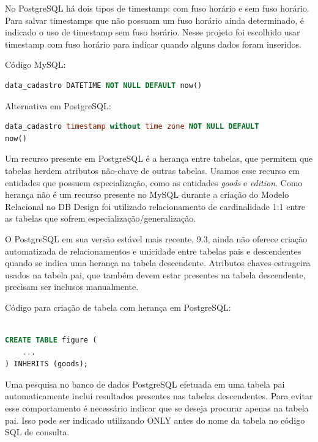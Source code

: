 \documentclass[12pt]{article}
\begin{document}
No PostgreSQL há dois tipos de timestamp: com fuso horário e sem fuso horário. Para salvar timestamps que não possuam um fuso horário ainda determinado, é indicado o uso de timestamp sem fuso horário. Nesse projeto foi escolhido usar timestamp com fuso horário para indicar quando alguns dados foram inseridos.

Código MySQL:

\begin{lstlisting}[language=SQL,morekeywords={now(),DATETIME}]
data_cadastro DATETIME NOT NULL DEFAULT now()
\end{lstlisting}

Alternativa em PostgreSQL:

\begin{lstlisting}[language=SQL,morekeywords={now(),without}]
data_cadastro timestamp without time zone NOT NULL DEFAULT
now()
\end{lstlisting}

Um recurso presente em PostgreSQL é a herança entre tabelas, que permitem que tabelas herdem atributos não-chave de outras tabelas. Usamos esse recurso em entidades que possuem especialização, como as entidades \textit{goods} e \textit{edition}. Como herança não é um recurso presente no MySQL durante a criação do Modelo Relacional no DB Design foi utilizado relacionamento de cardinalidade 1:1 entre as tabelas que sofrem especialização/generalização.

O PostgreSQL em sua versão estável mais recente, 9.3, ainda não oferece criação automatizada de relacionamentos e unicidade entre tabelas pais e descendentes quando se indica uma herança na tabela descendente. Atributos chaves-estrageira usados na tabela pai, que também devem estar presentes na tabela descendente, precisam ser inclusos manualmente.

Código para criação de tabela com herança em PostgreSQL:

\begin{lstlisting}[language=SQL,morekeywords={now(),without}]

CREATE TABLE figure (
    ...
) INHERITS (goods);
\end{lstlisting}

Uma pesquisa no banco de dados PostgreSQL efetuada em uma tabela pai automaticamente inclui resultados presentes nas tabelas descendentes. Para evitar esse comportamento é necessário indicar que se deseja procurar apenas na tabela pai. Isso pode ser indicado utilizando ONLY antes do nome da tabela no código SQL de consulta.
\end{document}
